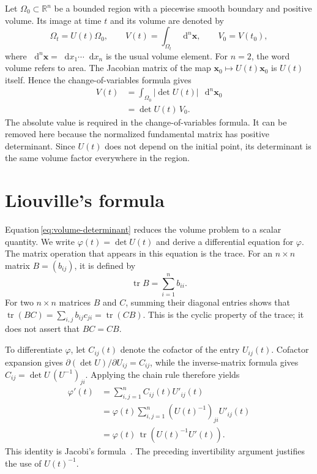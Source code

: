 \documentclass[a4paper,11pt]{article}
\newcommand{\R}{\mathbb{R}}
\newcommand{\dd}{\mathop{}\!\mathrm{d}}
\newcommand{\vect}[1]{\boldsymbol{#1}}
\DeclareMathOperator{\tr}{tr}
\numberwithin{equation}{section}
\begin{document}
Let $\Omega_0\subset\R^n$ be a bounded region with a piecewise smooth boundary
and positive volume. Its image at time $t$ and its volume are denoted by
\begin{equation}
  \Omega_t=U(t)\Omega_0,
  \qquad V(t)=\int_{\Omega_t}\dd^n\vect{x},
  \qquad V_0=V(t_0),
  \label{eq:region}
\end{equation}
where $\dd^n\vect{x}=\dd x_1\cdots\dd x_n$ is the usual volume element.
For $n=2$, the word volume refers to area. The Jacobian matrix of the map
$\vect{x}_0\mapsto U(t)\vect{x}_0$ is $U(t)$ itself. Hence the
change-of-variables formula gives
\begin{equation}
  \begin{aligned}
    V(t)
    &=\int_{\Omega_0}|\det U(t)|\,\dd^n\vect{x}_0\\
    &=\det U(t)\,V_0.
  \end{aligned}
  \label{eq:volume-determinant}
\end{equation}
The absolute value is required in the change-of-variables formula. It can
be removed here because the normalized fundamental matrix has positive
determinant. Since $U(t)$ does not depend on the initial point, its
determinant is the same volume factor everywhere in the region.

\section{Liouville's formula}
\label{sec:liouville}

Equation\,\eqref{eq:volume-determinant} reduces the volume problem to a
scalar quantity. We write $\varphi(t)=\det U(t)$ and derive a differential
equation for $\varphi$. The matrix operation that appears in this equation
is the trace. For an $n\times n$ matrix $B=(b_{ij})$, it is defined by
\begin{equation}
  \tr B=\sum_{i=1}^{n}b_{ii}.
  \label{eq:trace}
\end{equation}
For two $n\times n$ matrices $B$ and $C$, summing their diagonal entries
shows that $\tr(BC)=\sum_{i,j}b_{ij}c_{ji}=\tr(CB)$. This is the cyclic
property of the trace; it does not assert that $BC=CB$.

To differentiate $\varphi$, let $C_{ij}(t)$ denote the cofactor of the entry
$U_{ij}(t)$. Cofactor expansion gives
$\partial(\det U)/\partial U_{ij}=C_{ij}$, while the inverse-matrix formula
gives $C_{ij}=\det U\,(U^{-1})_{ji}$. Applying the chain rule therefore yields
\begin{equation}
  \begin{aligned}
    \varphi'(t)
    &=\sum_{i,j=1}^{n}C_{ij}(t)U'_{ij}(t)\\
    &=\varphi(t)\sum_{i,j=1}^{n}(U(t)^{-1})_{ji}U'_{ij}(t)\\
    &=\varphi(t)\,\tr\!\left(U(t)^{-1}U'(t)\right).
  \end{aligned}
  \label{eq:jacobi}
\end{equation}
This identity is Jacobi's formula~\cite[p.~1]{Kahan1998}. The preceding
invertibility argument justifies the use of $U(t)^{-1}$.
\end{document}
